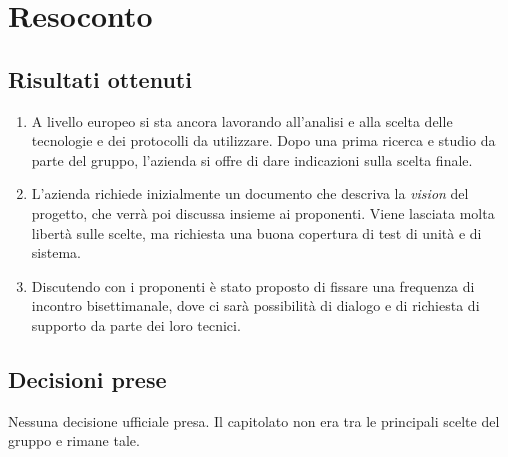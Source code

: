 \section{Resoconto}

\subsection{Risultati ottenuti}
\begin{enumerate}
    \item A livello europeo si sta ancora lavorando all'analisi e alla scelta delle tecnologie e dei protocolli da utilizzare. Dopo una prima ricerca e studio da parte del gruppo, l'azienda si offre di dare indicazioni sulla scelta finale.
    \item L'azienda richiede inizialmente un documento che descriva la \textit{vision} del progetto, che verrà poi discussa insieme ai proponenti. Viene lasciata molta libertà sulle scelte, ma richiesta una buona copertura di test di unità e di sistema.
    \item Discutendo con i proponenti è stato proposto di fissare una frequenza di incontro bisettimanale, dove ci sarà possibilità di dialogo e di richiesta di supporto da parte dei loro tecnici.
\end{enumerate}

\subsection{Decisioni prese}
Nessuna decisione ufficiale presa. Il capitolato non era tra le principali scelte del gruppo e rimane tale.
